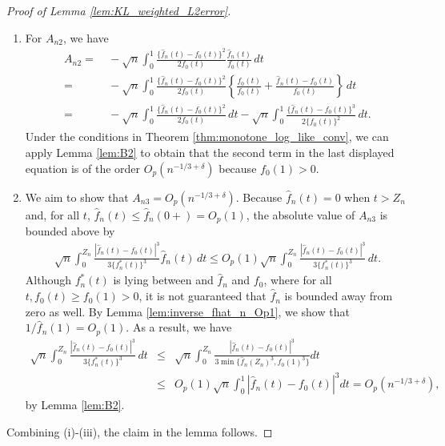 \documentclass[12pt,letterpaper, twoside, openany]{article}
\theoremstyle{plain}
\begin{document}
\begin{proof}[Proof of Lemma \ref{lem:KL_weighted_L2error}]
\begin{enumerate}
	
	\item [(ii)] For $A_{n2}$, we have
	\begin{align*}
		A_{n2} =&~-\sqrt{n}\int_0^1\frac{ \{\hat{f}_n(t) - f_0(t)\}^2}{2f_0(t)} \frac{\hat{f}_n(t)}{f_0(t)}\,dt\\
		=&~ -\sqrt{n}\int_0^1\frac{\{\hat{f}_n(t) - f_0(t)\}^2}{2f_0(t)}\left\{ \frac{f_0(t)}{f_0(t)} + \frac{\hat{f}_n(t) - f_0(t)}{f_0(t)}\right\} \,dt\\
		=&~ -\sqrt{n}\int_0^1\frac{\{\hat{f}_n(t) - f_0(t)\}^2}{2f_0(t)}\,dt
		- \sqrt{n}\int_0^1\frac{\{\hat{f}_n(t) - f_0(t)\}^3}{2\{f_0(t)\}^2}\,dt. 
	\end{align*}
	Under the conditions in Theorem \ref{thm:monotone_log_like_conv}, we can apply Lemma \ref{lem:B2} to obtain that the second term in the last displayed equation is of the order $O_p(n^{-1/3 + \delta} )$ because $f_0(1) > 0$.
	
	\item[(iii)]	We aim to show that $A_{n3} = O_p(n^{-1/3 + \delta})$.	Because $\hat{f}_n(t) = 0$ when $t>Z_n$ and, for all $t$, $\hat{f}_n(t) \leq \hat{f}_n(0+) = O_p(1)$, the absolute value of $A_{n3}$ is bounded above by 
	\begin{align*}
		\sqrt{n}\int_0^{Z_n}\frac{|\hat{f}_n(t) - f_0(t)|^3}{3\{f_n^*(t)\}^3} \hat{f}_n(t)\,dt 
		\leq O_p(1) \sqrt{n}\int_0^{Z_n}\frac{|\hat{f}_n(t) - f_0(t)|^3}{3\{f_n^*(t)\}^3}\,dt. 
	\end{align*}
	Although $f_n^*(t)$ is lying between and $\hat{f}_n$ and $f_0$, where for all $t, f_0(t) \geq f_0(1) > 0$, it is not guaranteed that $\hat{f}_n$ is bounded away from zero as well. By Lemma \ref{lem:inverse_fhat_n_Op1}, we show that $1/\hat{f}_n(1) = O_p(1)$. As a result, we have
	\begin{eqnarray*}
		\sqrt{n}\int_0^{Z_n}\frac{|\hat{f}_n(t) - f_0(t)|^3}{3\{f_n^*(t)\}^3}\,dt 
		&\leq &  \sqrt{n} \int^{Z_n}_0 \frac{|\hat{f}_n(t) - f_0(t)|^3}{3 \min\{\hat{f}_n(Z_n)^3, f_0(1)^3 \} } dt\\
		& \leq & O_p(1)  \sqrt{n} \int^1_0 |\hat{f}_n(t) - f_0(t)|^3 dt = O_p(n^{-1/3 +\delta}), 
	\end{eqnarray*}
	by Lemma \ref{lem:B2}.
\end{enumerate}
Combining (i)-(iii), the claim in the lemma follows.
%	
\end{proof}
\end{document}
